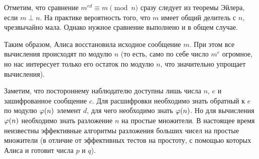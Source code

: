 {\small Отметим, что сравнение $m^{ed}\equiv m\pmod{n}$ сразу следует
  из теоремы Эйлера, если $m\perp n$. На практике вероятность того,
  что $m$ имеет общий делитель с $n$, чрезвычайно мала. Однако
  нужное сравнение выполнено и в общем случае.}

Таким образом, Алиса восстановила исходное сообщение $m$. При этом все
вычисления происходят по модулю $n$ 
(то есть, само по себе число $m^e$ огромное, но нас интересует только
его остаток по модулю $n$, что значительно упрощает вычисления).

Заметим, что постороннему наблюдателю доступны лишь числа $n$, $e$ и
зашифрованное сообщение $c$. Для расшифровки необходимо знать обратный
к $e$ по модулю $\varphi(n)$ элемент $d$, для чего необходимо знать
$\varphi(n)$. Но для вычисления $\varphi(n)$ необходимо знать разложение $n$
на простые множители. В настоящее время неизвестны эффективные
алгоритмы разложения больших чисел на простые множители (в отличие от
эффективных тестов на простоту, с помощью которых Алиса и готовит
числа $p$ и $q$). 
